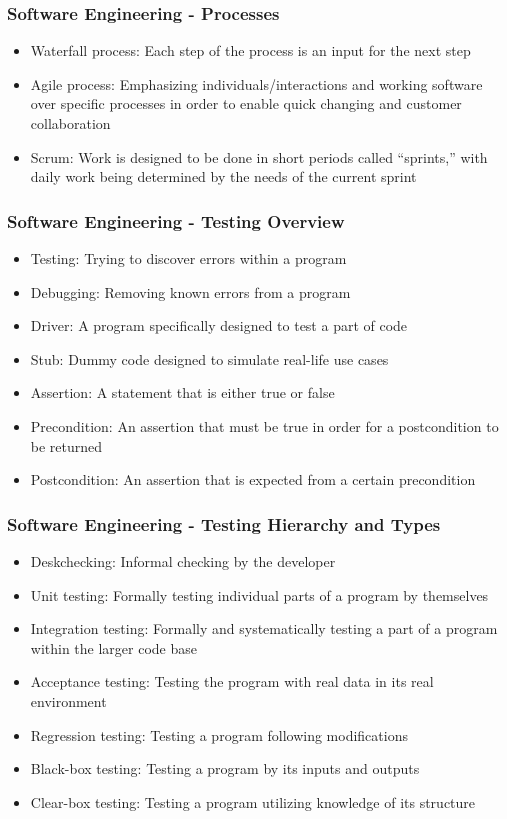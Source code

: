 \documentclass[c, aspectratio=169]{beamer}
\begin{document}
\begin{frame}\frametitle{Software Engineering - Processes}
\begin{itemize}
\item Waterfall process: Each step of the process is an input for the next step
\item Agile process: Emphasizing individuals/interactions and working software over specific processes in order to enable quick changing and customer collaboration
\item Scrum: Work is designed to be done in short periods called ``sprints,'' with daily work being determined by the needs of the current sprint
\end{itemize}
\end{frame}

\begin{frame}\frametitle{Software Engineering - Testing Overview}
\begin{itemize}
\item Testing: Trying to discover errors within a program
\item Debugging: Removing known errors from a program
\item Driver: A program specifically designed to test a part of code
\item Stub: Dummy code designed to simulate real-life use cases
\item Assertion: A statement that is either true or false
\item Precondition: An assertion that must be true in order for a postcondition to be returned
\item Postcondition: An assertion that is expected from a certain precondition
\end{itemize}
\end{frame}

\begin{frame}\frametitle{Software Engineering - Testing Hierarchy and Types}
\begin{itemize}
\item Deskchecking: Informal checking by the developer
\item Unit testing: Formally testing individual parts of a program by themselves
\item Integration testing: Formally and systematically testing a part of a program within the larger code base
\item Acceptance testing: Testing the program with real data in its real environment
\item Regression testing: Testing a program following modifications
\item Black-box testing: Testing a program by its inputs and outputs
\item Clear-box testing: Testing a program utilizing knowledge of its structure
\end{itemize}
\end{frame}
\end{document}

